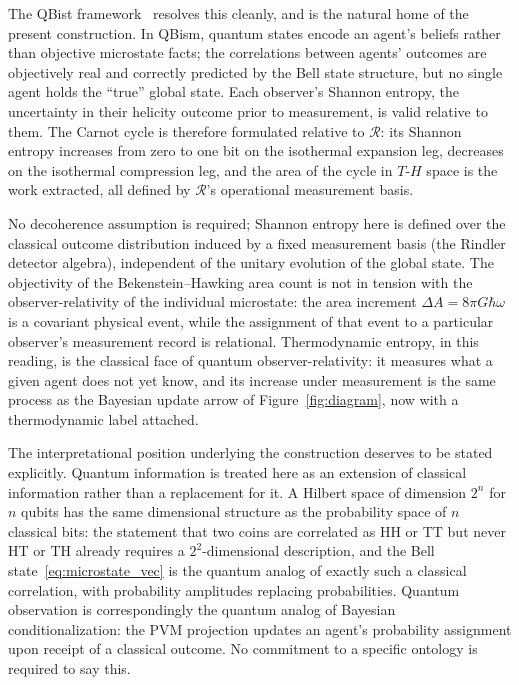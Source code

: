 The QBist framework~\cite{fuchs2014introducing} resolves 
this cleanly, and is the natural home of the present 
construction. In QBism, quantum states encode an 
agent's beliefs rather than objective microstate 
facts; the correlations between agents' outcomes 
are objectively real and correctly predicted by the 
Bell state structure, but no single agent holds the 
``true'' global state. Each observer's Shannon 
entropy, the uncertainty in their helicity 
outcome prior to measurement, is valid relative 
to them. The Carnot cycle is therefore formulated 
relative to $\mathcal{R}$: its Shannon entropy 
increases from zero to one bit on the isothermal 
expansion leg, decreases on the isothermal 
compression leg, and the area of the cycle in 
$T$-$H$ space is the work extracted, all defined 
by $\mathcal{R}$'s operational measurement basis.

No decoherence assumption is required; Shannon 
entropy here is defined over the classical outcome 
distribution induced by a fixed measurement basis 
(the Rindler detector algebra), independent of the 
unitary evolution of the global state. The objectivity 
of the Bekenstein--Hawking area count is not in 
tension with the observer-relativity of the 
individual microstate: the area increment 
$\Delta A = 8\pi G\hbar\omega$ is a covariant 
physical event, while the assignment of that event 
to a particular observer's measurement record is 
relational. Thermodynamic entropy, in this reading, 
is the classical face of quantum observer-relativity: 
it measures what a given agent does not yet know, 
and its increase under measurement is the same 
process as the Bayesian update arrow of 
Figure~\ref{fig:diagram}, now with a thermodynamic 
label attached.

The interpretational position underlying the 
construction deserves to be stated explicitly. 
Quantum information is treated here as an 
extension of classical information rather than 
a replacement for it. A Hilbert space of 
dimension $2^n$ for $n$ qubits has the same 
dimensional structure as the probability space 
of $n$ classical bits: the statement that two 
coins are correlated as HH or TT but never HT 
or TH already requires a $2^2$-dimensional 
description, and the Bell 
state~\eqref{eq:microstate_vec} is the quantum 
analog of exactly such a classical correlation, 
with probability amplitudes replacing 
probabilities. Quantum observation is 
correspondingly the quantum analog of Bayesian 
conditionalization: the PVM projection updates 
an agent's probability assignment upon receipt 
of a classical outcome. No commitment to a 
specific ontology is required to say this.

